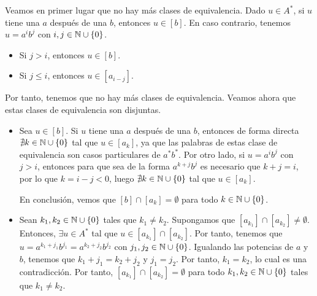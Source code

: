 \begin{ejercicio}
\begin{enumerate}
        Veamos en primer lugar que no hay más clases de equivalencia. Dado $u\in A^*$, si $u$ tiene una $a$ después de una $b$, entonces $u\in [b]$. En caso contrario, tenemos $u=a^ib^j$ con $i,j\in \mathbb{N}\cup \{0\}$.
        \begin{itemize}
            \item Si $j>i$, entonces $u\in [b]$.
            \item Si $j\leq i$, entonces $u\in [a_{i-j}]$.
        \end{itemize}
        Por tanto, tenemos que no hay más clases de equivalencia. Veamos ahora que estas clases de equivalencia son disjuntas.
        \begin{itemize}
            \item Sea $u\in [b]$. Si $u$ tiene una $a$ después de una $b$, entonces de forma directa $\nexists k\in \mathbb{N}\cup \{0\}$ tal que $u\in [a_k]$, ya que las palabras de estas clase de equivalencia son casos particulares de $a^*b^*$. Por otro lado, si $u=a^ib^j$ con $j>i$, entonces para que sea de la forma $a^{k+j}b^j$ es necesario que $k+j=i$, por lo que $k=i-j<0$, luego $\nexists k\in \mathbb{N}\cup \{0\}$ tal que $u\in [a_k]$.
            
            En conclusión, vemos que $[b]\cap [a_k]=\emptyset$ para todo $k\in \mathbb{N}\cup \{0\}$.

            \item Sean $k_1,k_2\in \mathbb{N}\cup \{0\}$ tales que $k_1\neq k_2$. Supongamos que $[a_{k_1}]\cap [a_{k_2}]\neq \emptyset$. Entonces, $\exists u\in A^*$ tal que $u\in [a_{k_1}]\cap [a_{k_2}]$. Por tanto, tenemos que $u=a^{k_1+j_1}b^{j_1}=a^{k_2+j_2}b^{j_2}$ con $j_1,j_2\in \mathbb{N}\cup \{0\}$. Igualando las potencias de $a$ y $b$, tenemos que $k_1+j_1=k_2+j_2$ y $j_1=j_2$. Por tanto, $k_1=k_2$, lo cual es una contradicción. Por tanto, $[a_{k_1}]\cap [a_{k_2}]=\emptyset$ para todo $k_1,k_2\in \mathbb{N}\cup \{0\}$ tales que $k_1\neq k_2$.
        \end{itemize}


\end{enumerate}
\end{ejercicio}
